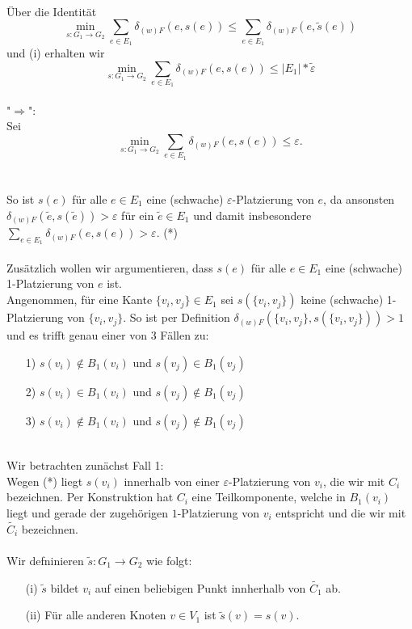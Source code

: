 \documentclass[a4paper, 12pt, twoside]{article}
\theoremstyle{Format1} %
\begin{document}
\\
Über die Identität $$\min_{s: G_1 \to G_2} \sum_{e \in E_1} \delta_{(w)F}(e, s(e)) \leq \sum_{e \in E_1} \delta_{(w)F}(e,\tilde{s}(e)) $$
und (i) erhalten wir
$$\min_{s: G_1 \to G_2} \sum_{e \in E_1} \delta_{(w)F}(e, s(e)) \leq |E_1| * \tilde{\varepsilon}$$
\\
"$\Rightarrow$":
\\
Sei $$\min_{s: G_1 \to G_2} \sum_{e \in E_1} \delta_{(w)F}(e, s(e)) \leq {\varepsilon}.$$
\\
\\
So ist $s(e)$ für alle $e \in E_1$ eine (schwache) $\varepsilon$-Platzierung von $e$,
da ansonsten $\delta_{(w)F}(\tilde{e}, s(\tilde{e})) > \varepsilon$ für ein $\tilde{e} \in E_1$ und damit insbesondere $\sum_{{e}\in E_1} \delta_{(w)F}(e, s(e)) > \varepsilon$.
(*)
\\
\\
Zusätzlich wollen wir argumentieren, dass $s(e)$ für alle $e \in E_1$ eine (schwache) 1-Platzierung von $e$ ist.
\\
Angenommen, für eine Kante $\{v_i,v_j\} \in E_1$ sei $s(\{v_i, v_j\})$ keine (schwache) 1-Platzierung von $\{v_i,v_j\}$.
So ist per Definition $\delta_{(w)F}(\{v_i,v_j\}, s(\{v_i, v_j\})) > 1$
und es trifft genau einer von 3 Fällen zu:
\begin{enumerate}
	\item[1)] $s(v_i) \notin B_1(v_i)$ und $s(v_j) \in B_1(v_j)$
	\item[2)] $s(v_i) \in B_1(v_i)$ und $s(v_j) \notin B_1(v_j)$
	\item[3)] $s(v_i) \notin B_1(v_i)$ und $s(v_j) \notin B_1(v_j)$
\end{enumerate}
\\
Wir betrachten zunächst Fall 1:
\\
Wegen (*) liegt $s(v_i)$ innerhalb von  einer $\varepsilon$-Platzierung von $v_i$, die wir mit $C_i$ bezeichnen.
Per Konstruktion hat $C_i$ eine Teilkomponente, welche in $B_1(v_i)$ liegt und gerade der zugehörigen $1$-Platzierung von $v_i$ entspricht und die wir mit $\tilde{C_i}$ bezeichnen.
\\
\\
Wir defninieren $\tilde{s}: G_1 \rightarrow G_2$ wie folgt:
\begin{enumerate}
	\item[(i)] $\tilde{s}$ bildet $v_i$ auf einen beliebigen Punkt innherhalb von $\tilde{C_1}$ ab.
	\item[(ii)] Für alle anderen Knoten $v \in V_1$ ist $\tilde{s}(v)=s(v)$.
\end{enumerate}
\end{document}
